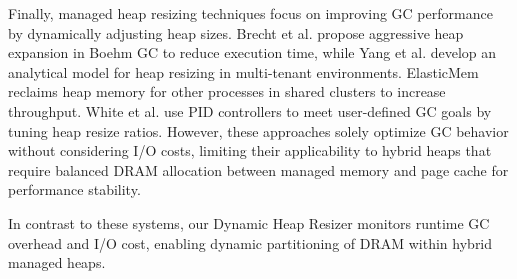 Finally, managed heap resizing techniques focus on improving GC performance by
dynamically adjusting heap sizes. Brecht et al. \cite{brecht} propose aggressive
heap expansion in Boehm GC to reduce execution time, while Yang et al.
\cite{yang} develop an analytical model for heap resizing in multi-tenant
environments. ElasticMem \cite{elasticmem} reclaims heap memory for other
processes in shared clusters to increase throughput. White et al. \cite{white}
use PID controllers to meet user-defined GC goals by tuning heap resize ratios.
However, these approaches solely optimize GC behavior without considering I/O
costs, limiting their applicability to hybrid heaps that require balanced DRAM
allocation between managed memory and page cache for performance stability.

In contrast to these systems, our Dynamic Heap Resizer monitors runtime GC
overhead and I/O cost, enabling dynamic partitioning of DRAM within hybrid
managed heaps.
